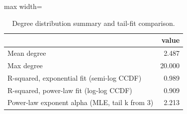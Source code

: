 \begin{table}
\centering
\caption{Degree distribution summary and tail-fit comparison.}
\label{tab:degree_fit}
\begin{adjustbox}{max width=\textwidth}
\begin{tabular}{lr}
\toprule
 & value \\
\midrule
Mean degree & 2.487 \\
Max degree & 20.000 \\
R-squared, exponential fit (semi-log CCDF) & 0.989 \\
R-squared, power-law fit (log-log CCDF) & 0.909 \\
Power-law exponent alpha (MLE, tail k from 3) & 2.213 \\
\bottomrule
\end{tabular}
\end{adjustbox}
\end{table}
